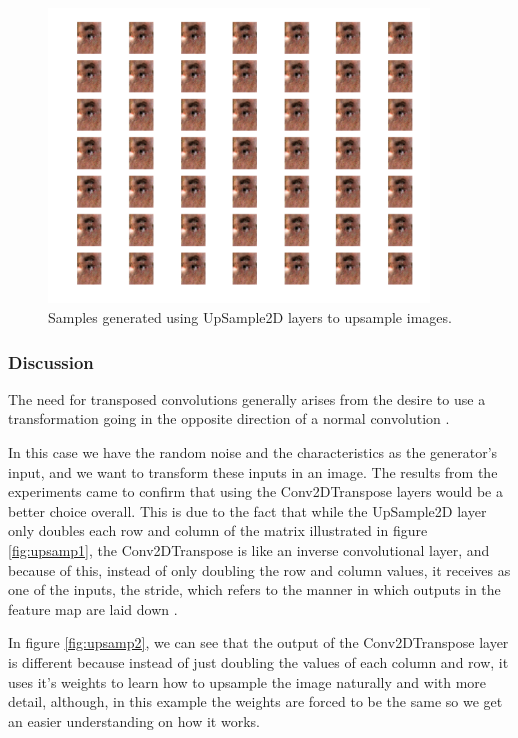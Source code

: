 \documentclass[12pt,a4paper,oneside]{memoir}
\begin{document}
\begin{figure}[H]
\centering
\includegraphics[width=0.9\textwidth]{images/upsample.png}
\caption{Samples generated using UpSample2D layers to upsample images.}
\centering
\label{fig:upsamp}
\end{figure}


\subsubsection{Discussion}
The need for transposed convolutions generally arises from the desire to use a transformation going in the opposite direction of a normal convolution \cite{2016arXiv160307285D}. 

\par

In this case we have the random noise and the characteristics as the generator's input, and we want to transform these inputs in an image. The results from the experiments came to confirm that using the Conv2DTranspose layers would be a better choice overall. This is due to the fact that while the UpSample2D layer only doubles each row and column of the matrix illustrated in figure \ref{fig:upsamp1}, the Conv2DTranspose is like an inverse convolutional layer, and because of this, instead of only doubling the row and column values, it receives as one of the inputs, the stride, which refers to the manner in which outputs in the feature map are laid down \cite{upsample}.

\par

In figure \ref{fig:upsamp2}, we can see that the output of the Conv2DTranspose layer is different because instead of just doubling the values of each column and row, it uses it's weights to learn how to upsample the image naturally and with more detail, although, in this example the weights are forced to be the same so we get an easier understanding on how it works.
\end{document}
